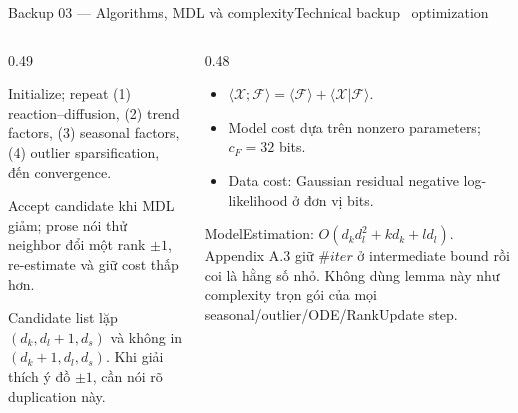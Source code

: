 \begin{frame}[shrink=28]{Backup 03 --- Algorithms, MDL và complexity}{Technical backup \textperiodcentered\ optimization}
\begin{columns}[T,onlytextwidth]
\begin{column}{0.49\textwidth}
\begin{mathcard}
  Initialize; repeat (1) reaction--diffusion, (2) trend factors, (3) seasonal factors, (4) outlier sparsification, đến convergence.
\end{mathcard}
\vspace{3mm}
\begin{intuition}
  Accept candidate khi MDL giảm; prose nói thử neighbor đổi một rank $\pm1$, re-estimate và giữ cost thấp hơn.
\end{intuition}
\vspace{3mm}
\begin{caution}
  Candidate list lặp $(d_k,d_l+1,d_s)$ và không in $(d_k+1,d_l,d_s)$. Khi giải thích ý đồ $\pm1$, cần nói rõ duplication này.
\end{caution}
\end{column}
\begin{column}{0.48\textwidth}
\begin{mathcard}
  \begin{itemize}
    \item $\langle\mathcal X;\mathcal F\rangle=\langle\mathcal F\rangle+\langle\mathcal X|\mathcal F\rangle$.
    \item Model cost dựa trên nonzero parameters; $c_F=32$ bits.
    \item Data cost: Gaussian residual negative log-likelihood ở đơn vị bits.
  \end{itemize}
\end{mathcard}
\vspace{3mm}
\begin{questioncard}
  \par
  ModelEstimation: $O(d_kd_l^2+kd_k+ld_l)$. Appendix A.3 giữ $\#iter$ ở intermediate bound rồi coi là hằng số nhỏ. Không dùng lemma này như complexity trọn gói của mọi seasonal/outlier/ODE/RankUpdate step.
\end{questioncard}
\end{column}
\end{columns}
\vspace{2mm}
\end{frame}

